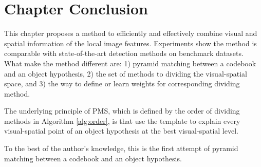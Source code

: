 \section{Chapter Conclusion}
\label{conc5}
This chapter proposes a method to efficiently and effectively combine visual and spatial information of the local image features. Experiments show the method is comparable with state-of-the-art detection methods on benchmark datasets. What make the method different are: 1) pyramid matching between a codebook and an  object hypothesis, 2) the set of methods to dividing the visual-spatial space, and 3) the way to define or learn weights for corresponding dividing method.

The underlying principle of PMS, which is defined by the order of dividing methods in Algorithm \ref{alg:order}, is that use the template to explain every visual-spatial point of an object hypothesis at the best visual-spatial level.

To the best of the author's knowledge, this is the first attempt of pyramid matching between a codebook and an object hypothesis.

